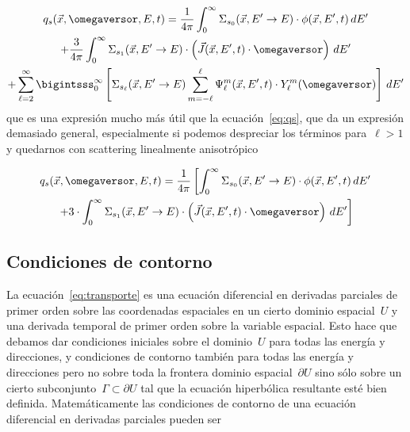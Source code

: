 \begin{multline}\label{eq:qsfacil}
 q_s(\vec{x}, \omegaversor, E, t) =
\frac{1}{4\pi} \int_{0}^{\infty} \Sigma_{s_0}(\vec{x}, E^{\prime} \rightarrow E) \cdot \phi(\vec{x}, E^{\prime}, t) \, dE^\prime \\
+ \frac{3}{4\pi} \int_{0}^{\infty} \Sigma_{s_1}(\vec{x}, E^{\prime} \rightarrow E) \cdot \left(\vec{J}(\vec{x},E^{\prime},t) \cdot \omegaversor\right) \, dE^\prime  \\
+ \sum_{\ell=2}^\infty \bigintsss_{0}^{\infty}   \left[ \Sigma_{s_\ell}(\vec{x}, E^{\prime} \rightarrow E) 
\sum_{m=-\ell}^{\ell} \Psi_\ell^m (\vec{x}, E^{\prime}, t) \cdot Y_\ell^{m}(\omegaversor)  \right] \, dE^{\prime}
\end{multline}
%
que es una expresión mucho más útil que la ecuación~\eqref{eq:qs}, que da un expresión demasiado general, especialmente si podemos despreciar los términos para~$\ell>1$ y quedarnos con scattering linealmente anisotrópico

\begin{multline}\label{eq:qslinealaniso}
 q_s(\vec{x}, \omegaversor, E, t) =
\frac{1}{4\pi} \left[ \int_{0}^{\infty} \Sigma_{s_0}(\vec{x}, E^{\prime} \rightarrow E) \cdot \phi(\vec{x}, E^{\prime}, t) \, dE^\prime \right. \\
\left. + 3 \cdot \int_{0}^{\infty} \Sigma_{s_1}(\vec{x}, E^{\prime} \rightarrow E) \cdot \left(\vec{J}(\vec{x},E^{\prime},t) \cdot \omegaversor\right) \, dE^\prime \right]
\end{multline}


\subsection{Condiciones de contorno} %
\label{sec:bctransporte}

La ecuación~\eqref{eq:transporte} es una ecuación diferencial en derivadas parciales de primer orden sobre las coordenadas espaciales en un cierto dominio espacial~$U$ y una derivada temporal de primer orden sobre la variable espacial. Esto hace que debamos dar condiciones iniciales sobre el dominio~$U$ para todas las energía y direcciones, y condiciones de contorno también para todas las energía y direcciones pero no sobre toda la frontera dominio espacial~$\partial U$ sino sólo sobre un cierto subconjunto~$\Gamma \subset \partial U$ tal que la ecuación hiperbólica resultante esté bien definida. Matemáticamente las condiciones de contorno de una ecuación diferencial en derivadas parciales pueden ser

